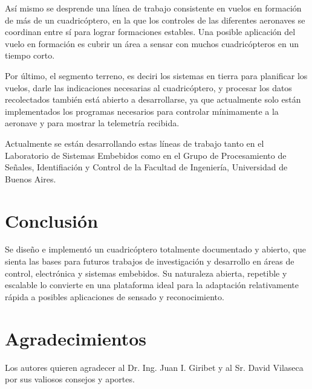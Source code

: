 \documentclass[a4paper, conference]{IEEEtran}
\begin{document}
Así mismo se desprende una línea de trabajo consistente en vuelos en formación de más de un cuadricóptero, en la que los controles de las diferentes aeronaves se coordinan entre sí para lograr formaciones estables. Una posible aplicación del vuelo en formación es cubrir un área a sensar con muchos cuadricópteros en un tiempo corto.

Por último, el segmento terreno, es deciri los sistemas en tierra para planificar los vuelos, darle las indicaciones necesarias al cuadricóptero, y procesar los datos recolectados también está abierto a desarrollarse, ya que actualmente solo están implementados los programas necesarios para controlar mínimamente a la aeronave y para mostrar la telemetría recibida.

Actualmente se están desarrollando estas líneas de trabajo tanto en el Laboratorio de Sistemas Embebidos como en el Grupo de Procesamiento de Señales, Identifiación y Control de la Facultad de Ingeniería, Universidad de Buenos Aires.

\vspace{5 mm}

\section*{Conclusión}

Se diseño e implementó un cuadricóptero totalmente documentado y abierto, que sienta las bases para futuros trabajos de investigación y desarrollo en áreas de control, electrónica y sistemas embebidos. 
Su naturaleza abierta, repetible y escalable lo convierte en una plataforma ideal  para la adaptación relativamente rápida a posibles aplicaciones de sensado y reconocimiento.

\vspace{5 mm}

\section*{Agradecimientos}
Los autores quieren agradecer al Dr. Ing. Juan I. Giribet y al Sr. David Vilaseca por sus valiosos consejos y aportes.

\vspace{5 mm}
\end{document}
